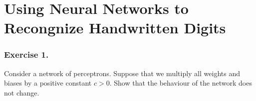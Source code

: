 \chapter{Using Neural Networks to Recongnize Handwritten Digits}

\subsection*{Exercise 1.} Consider a network of perceptrons. Suppose that
we multiply all weights and biases by a positive constant $c > 0$. Show 
that the behaviour of the network does not change.
